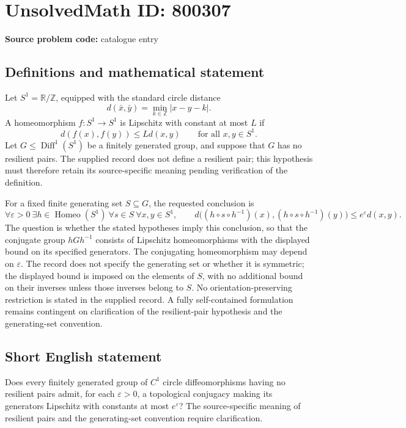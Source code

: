 \documentclass[11pt]{article}
\newcommand{\Z}{\mathbb{Z}}
\newcommand{\R}{\mathbb{R}}
\begin{document}
\section*{UnsolvedMath ID: 800307}
\textbf{Source problem code:} catalogue entry
\subsection{Definitions and mathematical statement}
Let \(S^1=\R/\Z\), equipped with the standard circle distance
\[
d(\bar x,\bar y)=\min_{k\in\Z}|x-y-k|.
\]
A homeomorphism \(f:S^1\to S^1\) is Lipschitz with constant at most \(L\) if
\[
d(f(x),f(y))\leq Ld(x,y)\qquad\text{for all }x,y\in S^1.
\]
Let \(G\leq\operatorname{Diff}^{1}(S^1)\) be a finitely generated group, and suppose that \(G\) has no resilient pairs. The supplied record does not define a resilient pair; this hypothesis must therefore retain its source-specific meaning pending verification of the definition.

For a fixed finite generating set \(S\subseteq G\), the requested conclusion is
\[
\forall\varepsilon>0\ \exists h\in\operatorname{Homeo}(S^1)\ \forall s\in S\ \forall x,y\in S^1,\qquad
 d\bigl((h\circ s\circ h^{-1})(x),(h\circ s\circ h^{-1})(y)\bigr)
 \leq e^{\varepsilon}d(x,y).
\]
The question is whether the stated hypotheses imply this conclusion, so that the conjugate group \(hGh^{-1}\) consists of Lipschitz homeomorphisms with the displayed bound on its specified generators. The conjugating homeomorphism may depend on \(\varepsilon\). The record does not specify the generating set or whether it is symmetric; the displayed bound is imposed on the elements of \(S\), with no additional bound on their inverses unless those inverses belong to \(S\). No orientation-preserving restriction is stated in the supplied record. A fully self-contained formulation remains contingent on clarification of the resilient-pair hypothesis and the generating-set convention.
\subsection{Short English statement}
Does every finitely generated group of \(C^1\) circle diffeomorphisms having no resilient pairs admit, for each \(\varepsilon>0\), a topological conjugacy making its generators Lipschitz with constants at most \(e^{\varepsilon}\)? The source-specific meaning of resilient pairs and the generating-set convention require clarification.
\end{document}
